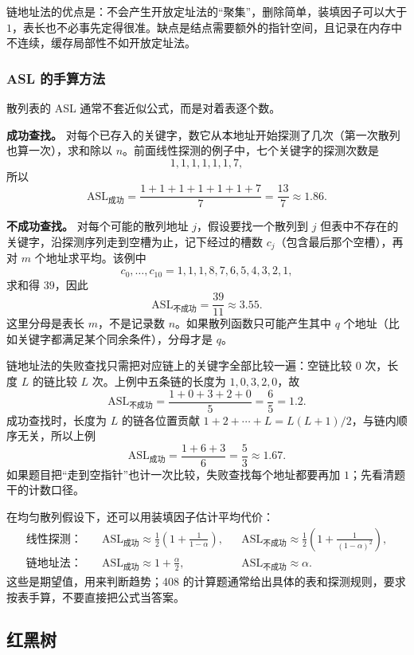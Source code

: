链地址法的优点是：不会产生开放定址法的“聚集”，删除简单，装填因子可以大于 $1$，表长也不必事先定得很准。缺点是结点需要额外的指针空间，且记录在内存中不连续，缓存局部性不如开放定址法。

\subsubsection{ASL 的手算方法}

散列表的 ASL 通常不套近似公式，而是对着表逐个数。

\textbf{成功查找。} 对每个已存入的关键字，数它从本地址开始探测了几次（第一次散列也算一次），求和除以 $n$。前面线性探测的例子中，七个关键字的探测次数是
\[
1,1,1,1,1,1,7,
\]
所以
\[
\mathrm{ASL}_{\text{成功}}=\frac{1+1+1+1+1+1+7}{7}=\frac{13}{7}\approx1.86.
\]

\textbf{不成功查找。} 对每个可能的散列地址 $j$，假设要找一个散列到 $j$ 但表中不存在的关键字，沿探测序列走到空槽为止，记下经过的槽数 $c_j$（包含最后那个空槽），再对 $m$ 个地址求平均。该例中
\[
c_0,\ldots,c_{10}=1,1,1,8,7,6,5,4,3,2,1,
\]
求和得 $39$，因此
\[
\mathrm{ASL}_{\text{不成功}}=\frac{39}{11}\approx3.55.
\]
这里分母是表长 $m$，不是记录数 $n$。如果散列函数只可能产生其中 $q$ 个地址（比如关键字都满足某个同余条件），分母才是 $q$。

链地址法的失败查找只需把对应链上的关键字全部比较一遍：空链比较 $0$ 次，长度 $L$ 的链比较 $L$ 次。上例中五条链的长度为 $1,0,3,2,0$，故
\[
\mathrm{ASL}_{\text{不成功}}=\frac{1+0+3+2+0}{5}=\frac{6}{5}=1.2.
\]
成功查找时，长度为 $L$ 的链各位置贡献 $1+2+\cdots+L=L(L+1)/2$，与链内顺序无关，所以上例
\[
\mathrm{ASL}_{\text{成功}}=\frac{1+6+3}{6}=\frac{5}{3}\approx1.67.
\]
如果题目把“走到空指针”也计一次比较，失败查找每个地址都要再加 $1$；先看清题干的计数口径。

在均匀散列假设下，还可以用装填因子估计平均代价：
\[
\begin{aligned}
\text{线性探测：}\quad &\mathrm{ASL}_{\text{成功}}\approx\frac12\left(1+\frac{1}{1-\alpha}\right),
&&\mathrm{ASL}_{\text{不成功}}\approx\frac12\left(1+\frac{1}{(1-\alpha)^2}\right),\\
\text{链地址法：}\quad &\mathrm{ASL}_{\text{成功}}\approx1+\frac{\alpha}{2},
&&\mathrm{ASL}_{\text{不成功}}\approx\alpha.
\end{aligned}
\]
这些是期望值，用来判断趋势；408 的计算题通常给出具体的表和探测规则，要求按表手算，不要直接把公式当答案。

\subsection{红黑树}

